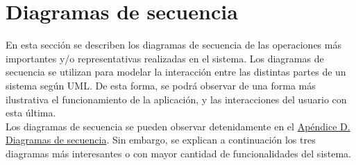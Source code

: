 \section{Diagramas de secuencia}

En esta sección se describen los diagramas de secuencia de las operaciones más importantes y/o representativas realizadas en el sistema. Los diagramas de secuencia se utilizan para modelar la interacción entre las distintas partes de un sistema según UML. De esta forma, se podrá observar de una forma más ilustrativa el funcionamiento de la aplicación, y las interacciones del usuario con esta última. 
\\

Los diagramas de secuencia se pueden observar detenidamente en el \hyperref[enlaceDiagramasSecuencia]{Apéndice D. Diagramas de secuencia}. Sin embargo, se explican a continuación los tres diagramas más interesantes o con mayor cantidad de funcionalidades del sistema.



